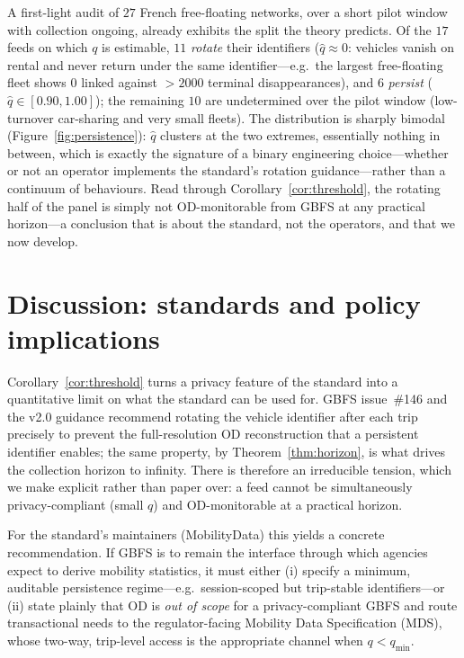 A first-light audit of $27$ French free-floating networks, over a short pilot
window with collection ongoing, already exhibits the split the theory predicts.
Of the $17$ feeds on which $q$ is estimable, $11$ \emph{rotate} their identifiers
($\hat q\approx 0$: vehicles vanish on rental and never return under the same
identifier---e.g.\ the largest free-floating fleet shows $0$ linked against
$>2000$ terminal disappearances), and $6$ \emph{persist}
($\hat q\in[0.90,1.00]$); the remaining $10$ are undetermined over the pilot
window (low-turnover car-sharing and very small fleets). The distribution is
sharply bimodal (Figure~\ref{fig:persistence}): $\hat q$ clusters at the two
extremes, essentially nothing in between, which is exactly the signature of a
binary engineering choice---whether or not an operator implements the standard's
rotation guidance---rather than a continuum of behaviours.
 Read through Corollary~\ref{cor:threshold}, the
rotating half of the panel is simply not OD-monitorable from GBFS at any
practical horizon---a conclusion that is about the standard, not the operators,
and that we now develop.

\section{Discussion: standards and policy implications}
\label{sec:discussion}

Corollary~\ref{cor:threshold} turns a privacy feature of the standard into a
quantitative limit on what the standard can be used for. GBFS issue~\#146 and the
v2.0 guidance recommend rotating the vehicle identifier after each trip precisely
to prevent the full-resolution OD reconstruction that a persistent identifier
enables; the same property, by Theorem~\ref{thm:horizon}, is what drives the
collection horizon to infinity. There is therefore an irreducible tension, which
we make explicit rather than paper over: a feed cannot be simultaneously
privacy-compliant (small $q$) and OD-monitorable at a practical horizon.

For the standard's maintainers (MobilityData) this yields a concrete
recommendation. If GBFS is to remain the interface through which agencies expect
to derive mobility statistics, it must either (i) specify a minimum, auditable
persistence regime---e.g.\ session-scoped but trip-stable identifiers---or
(ii) state plainly that OD is \emph{out of scope} for a privacy-compliant GBFS
and route transactional needs to the regulator-facing Mobility Data
Specification (MDS), whose two-way, trip-level access is the appropriate channel
when $q<q_{\min}$. 


